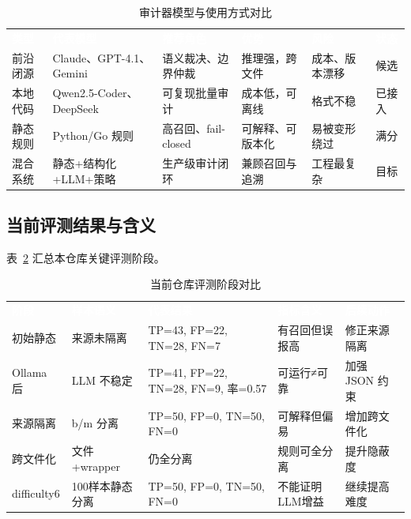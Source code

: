 \documentclass[11pt,a4paper,onecolumn]{article}
\newcommand{\tabheader}[1]{\textcolor{white}{\textbf{#1}}}
\begin{document}
\begin{table}[htbp]
\caption{审计器模型与使用方式对比}
\label{tab:model_matrix}
\centering
\small
\begin{tabularx}{\textwidth}{@{} p{}X X X X p{} @{}}
\rowcolor{tabhead}
\tabheader{类型} & \tabheader{代表模型} & \tabheader{推荐角色} & \tabheader{优势} & \tabheader{风险} & \tabheader{状态} \\
\rowcolor{tabalt} 前沿闭源 & Claude、GPT-4.1、Gemini & 语义裁决、边界仲裁 & 推理强，跨文件 & 成本、版本漂移 & 候选 \\
本地代码 & Qwen2.5-Coder、DeepSeek & 可复现批量审计 & 成本低，可离线 & 格式不稳 & 已接入 \\
\rowcolor{tabalt} 静态规则 & Python/Go 规则 & 高召回、fail-closed & 可解释、可版本化 & 易被变形绕过 & 满分 \\
混合系统 & 静态+结构化+LLM+策略 & 生产级审计闭环 & 兼顾召回与追溯 & 工程最复杂 & 目标 \\
\end{tabularx}
\end{table}

\subsection{当前评测结果与含义}
表~\ref{tab:result_matrix} 汇总本仓库关键评测阶段。

\begin{table}[htbp]
\caption{当前仓库评测阶段对比}
\label{tab:result_matrix}
\centering
\small
\begin{tabularx}{\textwidth}{@{} p{}X X X X @{}}
\rowcolor{tabhead}
\tabheader{阶段} & \tabheader{样本语义} & \tabheader{代表结果} & \tabheader{指标含义} & \tabheader{后续动作} \\
\rowcolor{tabalt} 初始静态 & 来源未隔离 & TP=43, FP=22, TN=28, FN=7 & 有召回但误报高 & 修正来源隔离 \\
Ollama 后 & LLM 不稳定 & TP=41, FP=22, TN=28, FN=9, 率=0.57 & 可运行≠可靠 & 加强 JSON 约束 \\
\rowcolor{tabalt} 来源隔离 & b/m 分离 & TP=50, FP=0, TN=50, FN=0 & 可解释但偏易 & 增加跨文件化 \\
跨文件化 & 文件+wrapper & 仍全分离 & 规则可全分离 & 提升隐蔽度 \\
\rowcolor{tabalt} difficulty6 & 100样本静态分离 & TP=50, FP=0, TN=50, FN=0 & 不能证明LLM增益 & 继续提高难度 \\
\end{tabularx}
\end{table}
\end{document}
